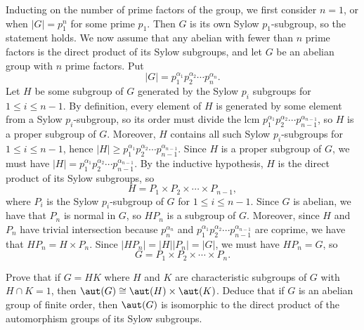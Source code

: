 \begin{sol}
    Inducting on the number of prime factors of the group, we first consider $n = 1$, or when $|G| = p_1^n$ for some prime $p_1$. Then $G$ is its own Sylow $p_1$-subgroup, so the statement holds. We now assume that any abelian with fewer than $n$ prime factors is the direct product of its Sylow subgroups, and let $G$ be an abelian group with $n$ prime factors. Put
    \[|G| = p_1^{\alpha_1} p_2^{\alpha_2} \cdots p_n^{\alpha_n}.\]
    Let $H$ be some subgroup of $G$ generated by the Sylow $p_i$ subgroups for $1 \leq i \leq n - 1$. By definition, every element of $H$ is generated by some element from a Sylow $p_i$-subgroup, so its order must divide the lcm $p_1^{\alpha_1} p_2^{\alpha_2} \cdots p_{n-1}^{\alpha_{n-1}}$, so $H$ is a proper subgroup of $G$. Moreover, $H$ contains all such Sylow $p_i$-subgroups for $1 \leq i \leq n - 1$, hence $|H| \geq p_1^{\alpha_1} p_2^{\alpha_2} \cdots p_{n-1}^{\alpha_{n-1}}$. Since $H$ is a proper subgroup of $G$, we must have $|H| = p_1^{\alpha_1} p_2^{\alpha_2} \cdots p_{n-1}^{\alpha_{n-1}}$. By the inductive hypothesis, $H$ is the direct product of its Sylow subgroups, so
    \[H = P_1 \times P_2 \times \cdots \times P_{n-1},\]
    where $P_i$ is the Sylow $p_i$-subgroup of $G$ for $1 \leq i \leq n - 1$. Since $G$ is abelian, we have that $P_n$ is normal in $G$, so $HP_n$ is a subgroup of $G$. Moreover, since $H$ and $P_n$ have trivial intersection because $p_n^{\alpha_n}$ and $p_1^{\alpha_1} p_2^{\alpha_2} \cdots p_{n-1}^{\alpha_{n-1}}$ are coprime, we have that $HP_n = H \times P_n$. Since $|HP_n| = |H||P_n| = |G|$, we must have $HP_n = G$, so
    \[G = P_1 \times P_2 \times \cdots \times P_n.\] \qh
\end{sol}

\newpage

\begin{specialexercise}\label{ex5.4.11}
    Prove that if $G = HK$ where $H$ and $K$ are characteristic subgroups of $G$ with $H \cap K = 1$, then $\aut(G) \cong \aut(H) \times \aut(K)$. Deduce that if $G$ is an abelian group of finite order, then $\aut(G)$ is isomorphic to the direct product of the automorphism groups of its Sylow subgroups.
\end{specialexercise}

